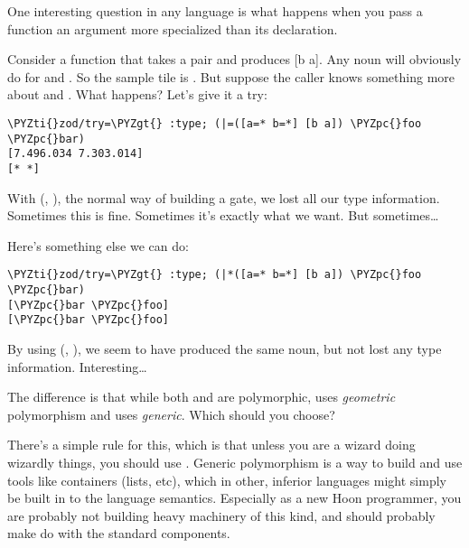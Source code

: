 One interesting question in any language is what happens when you
pass a function an argument more specialized than its declaration.

Consider a function that takes a pair \kode{[a b]} and produces [b a].
Any noun will obviously do for  and .  So the sample tile
is \kode{[a=\textbackslash{}* b=\textbackslash{}*]}.  But suppose the caller knows something more
about  and .  What happens?  Let's give it a try:

\begin{framed_shaded}
\begin{Verbatim}[fontsize=\relsize{-2.5},fontseries=b,commandchars=\\\{\}]
\PYZti{}zod/try=\PYZgt{} :type; (|=([a=* b=*] [b a]) \PYZpc{}foo \PYZpc{}bar)
[7.496.034 7.303.014]
[* *]
\end{Verbatim}
\end{framed_shaded}
With \kode{\textbar{}=} (, ), the normal way of building a gate,
we lost all our type information.  Sometimes this is fine.
Sometimes it's exactly what we want.  But sometimes\ldots{}

Here's something else we can do:

\begin{framed_shaded}
\begin{Verbatim}[fontsize=\relsize{-2.5},fontseries=b,commandchars=\\\{\}]
\PYZti{}zod/try=\PYZgt{} :type; (|*([a=* b=*] [b a]) \PYZpc{}foo \PYZpc{}bar)
[\PYZpc{}bar \PYZpc{}foo]
[\PYZpc{}bar \PYZpc{}foo]
\end{Verbatim}
\end{framed_shaded}
By using \kode{\textbar{}\textbackslash{}*} (, ), we seem to have produced the
same noun, but not lost any type information.  Interesting\ldots{}

The difference is that while both \kode{\textbar{}=} and \kode{\textbar{}\textbackslash{}*} are polymorphic,
\kode{\textbar{}=} uses \emph{geometric} polymorphism and \kode{\textbar{}\textbackslash{}*} uses \emph{generic}.
Which should you choose?

There's a simple rule for this, which is that unless you are a
wizard doing wizardly things, you should use \kode{\textbar{}=}.  Generic
polymorphism is a way to build and use tools like containers
(lists, etc), which in other, inferior languages might simply be
built in to the language semantics.  Especially as a new Hoon
programmer, you are probably not building heavy machinery of this
kind, and should probably make do with the standard components.

